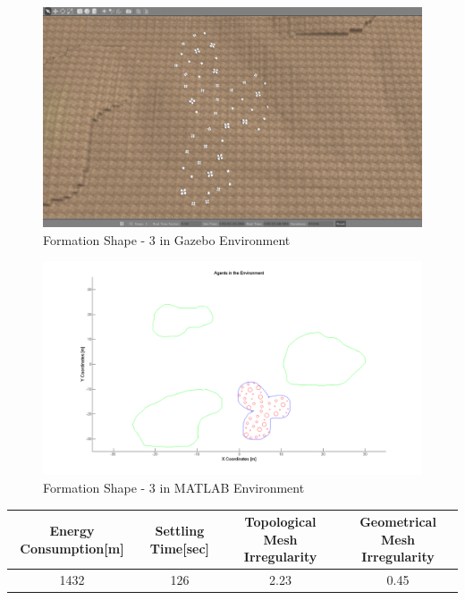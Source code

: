 \documentclass[twoside]{article}
\begin{document}
		
		
				 \begin{figure}[H]
				 	\caption{Formation Shape - 3 in Gazebo Environment}
				 	\centerline{\includegraphics[scale = 0.35]{3_Gazebo}}
				 \end{figure} 
				 
				 \begin{figure}[H]
				 	\caption{Formation Shape - 3 in MATLAB Environment}
				 	\centerline{\includegraphics[scale = 0.40]{3}}
				 \end{figure} 
				 
				 \begin{center}
				 	 \label{tab:title} 
				 	\begin{tabular}{||c| c |c |c ||}
				 		
				 		\hline
				 		\textbf{Energy Consumption[m]}  & \textbf{Settling Time[sec]} & \textbf{Topological Mesh Irregularity} & \textbf{Geometrical Mesh Irregularity}\\ 
				 		\hline
				 		1432 & 126 &  2.23& 0.45\\
				 		\hline
				 	\end{tabular}
				 \end{center}
				 
\end{document}
